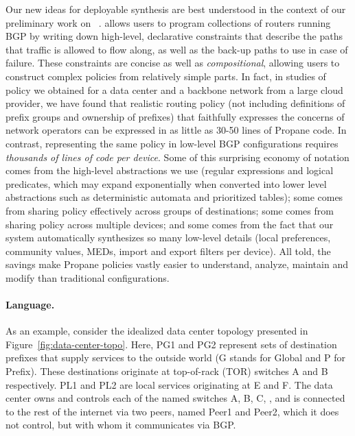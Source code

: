 Our new ideas for deployable synthesis are best understood in the context of
our preliminary work on \Propane~\cite{beckett+:propane}. 
%
\Propane allows users to program collections of routers running BGP
by writing down high-level, declarative constraints that 
describe the paths that traffic is allowed to flow along, as well
as the back-up paths to use in case of failure.  These constraints are
concise as well as {\em compositional}, allowing users to
construct complex policies
from relatively simple parts.  In fact, in studies of policy we obtained
for a data center 
and a backbone network from a large cloud provider, we have found that 
realistic
routing policy (not including definitions of prefix groups and ownership of
prefixes) that faithfully expresses the concerns of network operators
can be expressed in as little as 30-50 lines of Propane
code.  In contrast, representing the same policy in low-level BGP 
configurations requires \emph{thousands of lines of code per device}.
Some of this surprising economy of notation comes from the high-level 
abstractions we use
(regular expressions and logical predicates, which may expand exponentially
when converted into lower level abstractions such as deterministic
automata and prioritized tables); some comes from sharing
policy effectively across groups of destinations; some comes from
sharing policy across multiple devices; and some comes from the fact
that our system automatically synthesizes so many low-level details (local preferences,
community values, MEDs, import and export filters per device).  All told, 
the savings make Propane policies vastly
easier to understand, analyze, maintain and modify than traditional
configurations.

\paragraph*{Language.}
As an example, consider the idealized data center topology presented in
Figure~\ref{fig:data-center-topo}.  Here, PG1 and PG2 represent sets
of destination prefixes that supply services to the outside world (G stands
for Global and P for Prefix).  These destinations originate at top-of-rack (TOR)
switches A and B respectively.  PL1 and PL2 are local services originating
at E and F.  The data center owns and controls each of the named switches
A, B, C, \etc, and is connected to the rest of the internet via
two peers, named Peer1 and Peer2, which it does not control, but with
whom it communicates via BGP.

